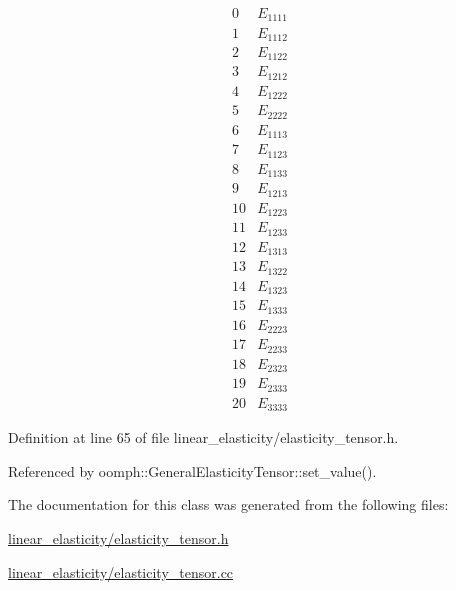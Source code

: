 \[\begin{array}{cc} 0 & E_{1111} \\ 1 & E_{1112} \\ 2 & E_{1122} \\ 3 & E_{1212} \\ 4 & E_{1222} \\ 5 & E_{2222} \\ 6 & E_{1113} \\ 7 & E_{1123} \\ 8 & E_{1133} \\ 9 & E_{1213} \\ 10 & E_{1223} \\ 11 & E_{1233} \\ 12 & E_{1313} \\ 13 & E_{1322} \\ 14 & E_{1323} \\ 15 & E_{1333} \\ 16 & E_{2223} \\ 17 & E_{2233} \\ 18 & E_{2323} \\ 19 & E_{2333} \\ 20 & E_{3333} \end{array}\] 

Definition at line 65 of file linear\+\_\+elasticity/elasticity\+\_\+tensor.\+h.



Referenced by oomph\+::\+General\+Elasticity\+Tensor\+::set\+\_\+value().



The documentation for this class was generated from the following files\+:\begin{DoxyCompactItemize}
\item 
\hyperlink{linear__elasticity_2elasticity__tensor_8h}{linear\+\_\+elasticity/elasticity\+\_\+tensor.\+h}\item 
\hyperlink{linear__elasticity_2elasticity__tensor_8cc}{linear\+\_\+elasticity/elasticity\+\_\+tensor.\+cc}\end{DoxyCompactItemize}
